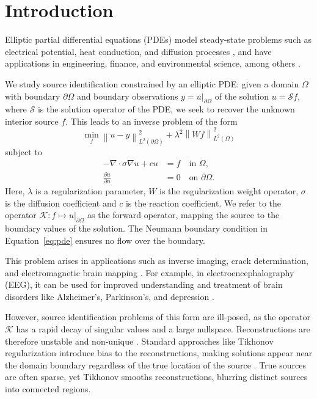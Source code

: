 \section{Introduction}
Elliptic partial differential equations (PDEs) model steady-state problems such as electrical potential, heat conduction, and diffusion processes \cite{straussPartialDifferentialEquations2007}, and have applications in engineering, finance, and environmental science, among others \cite{evansPartialDifferentialEquations2010,pavliotisStochasticProcessesApplications2014}.

We study source identification constrained by an elliptic PDE: given a domain $\Omega$ with boundary $\partial\Omega$ and boundary observations $y = u|_{\partial\Omega}$ of the solution $u = \mathcal{S}f$, where $\mathcal{S}$ is the solution operator of the PDE, we seek to recover the unknown interior source $f$. This leads to an inverse problem of the form
\begin{equation}\label{eq:problem}
    \min_{f} \left\| u - y \right\|_{L^2(\partial\Omega)}^2
    + \lambda^2 \left\| W f \right\|_{L^2(\Omega)}^2
\end{equation}
subject to
\begin{equation}\label{eq:pde}
    \begin{aligned}
    -\nabla \cdot \sigma\nabla u + c u &= f \quad \text{in } \Omega, \\
    \frac{\partial u}{\partial n} &= 0 \quad \text{on } \partial\Omega.
    \end{aligned}
\end{equation}
Here, $\lambda$ is a regularization parameter, $W$ is the regularization weight operator, $\sigma$ is the diffusion coefficient and $c$ is the reaction coefficient. We refer to the operator $\mathcal{K}: f \mapsto u|_{\partial\Omega}$ as the forward operator, mapping the source to the boundary values of the solution. The Neumann boundary condition in Equation~\eqref{eq:pde} ensures no flow over the boundary.

This problem arises in applications such as inverse imaging, crack determination, and electromagnetic brain mapping \cite{nielsenComputingIschemicRegions2013,elulGenesisEEG1971,PDFRecoveryCracks}. For example, in electroencephalography (EEG), it can be used for improved understanding and treatment of brain disorders like Alzheimer's, Parkinson's, and depression \cite{elulGenesisEEG1971, ElectromagneticBrainMapping}.

However, source identification problems of this form are ill-posed, as the operator $\mathcal K$ has a rapid decay of singular values and a large nullspace. Reconstructions are therefore unstable and non-unique \cite{hansen2010discrete}. Standard approaches like Tikhonov regularization introduce bias to the reconstructions, making solutions appear near the domain boundary regardless of the true location of the source \cite{elvetunRegularizationOperatorSource2020}. True sources are often sparse, yet Tikhonov smooths reconstructions, blurring distinct sources into connected regions.

